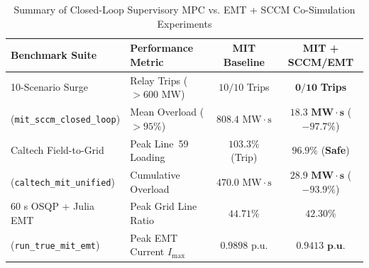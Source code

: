 \documentclass[journal]{IEEEtran}
\begin{document}
\begin{table}[!t]
\centering
\caption{Summary of Closed-Loop Supervisory MPC vs. EMT + SCCM Co-Simulation Experiments}
\label{tab:mit_emt_results}
\scriptsize
\setlength{\tabcolsep}{3.2pt}
\renewcommand{\arraystretch}{1.15}
\begin{tabular}{@{}llcc@{}}
\toprule
\textbf{Benchmark Suite} & \textbf{Performance Metric} & \textbf{MIT Baseline} & \textbf{MIT + SCCM/EMT} \\
\midrule
10-Scenario Surge & Relay Trips ($>600\text{ MW}$) & $10/10$ Trips & $\mathbf{0/10}$ \textbf{Trips} \\
(\texttt{mit\_sccm\_closed\_loop}) & Mean Overload ($>95\%$) & $808.4\text{ MW}\cdot\text{s}$ & $\mathbf{18.3\text{ MW}\cdot\text{s}}$ ($-97.7\%$) \\
\midrule
Caltech Field-to-Grid & Peak Line~59 Loading & $103.3\%$ (Trip) & $\mathbf{96.9\%}$ (\textbf{Safe}) \\
(\texttt{caltech\_mit\_unified}) & Cumulative Overload & $470.0\text{ MW}\cdot\text{s}$ & $\mathbf{28.9\text{ MW}\cdot\text{s}}$ ($-93.9\%$) \\
\midrule
60 s OSQP + Julia EMT & Peak Grid Line Ratio & $44.71\%$ & $\mathbf{42.30\%}$ \\
(\texttt{run\_true\_mit\_emt}) & Peak EMT Current $I_{\max}$ & $0.9898\text{ p.u.}$ & $\mathbf{0.9413\text{ p.u.}}$ \\
\bottomrule
\end{tabular}
\end{table}
\end{document}
